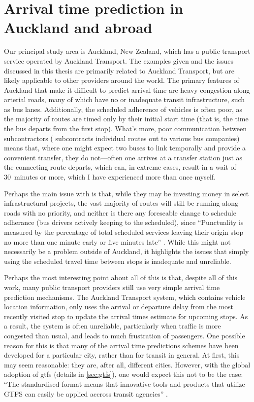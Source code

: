 \section{Arrival time prediction in Auckland and abroad}
\label{sec:auckland_etas}

Our principal study area is Auckland, New Zealand, which has a public transport service operated by Auckland Transport. The examples given and the issues discussed in this thesis are primarily related to Auckland Transport, but are  likely applicable to other providers around the world. The primary features of Auckland that make it difficult to predict arrival time are heavy congestion along arterial roads, many of which have no or inadequate transit infrastructure, such as bus lanes. Additionally, the scheduled adherence of vehicles is often poor, as the majority of routes are timed only by their initial start time (that is, the time the bus departs from the first stop). What's more, poor communication between subcontractors (\AT{} subcontracts individual routes out to various bus companies) means that, where one might expect two buses to link temporally and provide a convenient transfer, they do not---often one arrives at a transfer station just as the connecting route departs, which can, in extreme cases, result in a wait of 30~minutes or more, which I have experienced more than once myself.


Perhaps the main issue with \AT{} is that, while they may be investing money in select infrastructural projects, the vast majority of routes will still be running along roads with no priority, and neither is there any foreseable change to schedule adherance (bus drivers actively keeping to the scheduled), since ``Punctuality is measured by the percentage of total scheduled services leaving their origin stop no more than one minute early or five minutes late'' \citep[13]{AT_report_2019}. While this might not necessarily be a problem outside of Auckland, it highlights the issues that simply using the scheduled travel time between stops is inadequate and unreliable.


Perhaps the most interesting point about all of this is that, despite all of this work, many public transport providers still use very simple arrival time prediction mechanisms. The Auckland Transport system, which contains \rt{} vehicle location information, only uses the arrival or departure delay from the most recently visited stop to update the arrival times estimate for upcoming stops. As a result, the system is often unreliable, particularly when traffic is more congested than usual, and leads to much frustration of passengers. One possible reason for this is that many of the arrival time predictions schemes have been developed for a particular city, rather than for transit in general. At first, this may seem reasonable: they are, after all, different cities. However, with the global adoption of \gls{gtfs} (details in \cref{sec:gtfs}), one would expect this not to be the case: ``The standardised format means that innovative tools and products that utilize GTFS can easily be applied accross transit agencies'' \citep[26]{TCRP_2020}.



